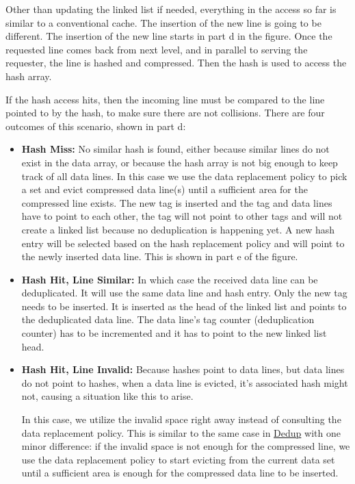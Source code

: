 Other than updating the linked list if needed, everything in the access so far is similar to a conventional cache. The insertion of the new line is going to be different. The insertion of the new line starts in part d in the figure. Once the requested line comes back from next level, and in parallel to serving the requester, the line is hashed and compressed. Then the hash is used to access the hash array.\par
If the hash access hits, then the incoming line must be compared to the line pointed to by the hash, to make sure there are not collisions. There are four outcomes of this scenario, shown in part d:
\begin{itemize}
    \item \textbf{Hash Miss:} No similar hash is found, either because similar lines do not exist in the data array, or because the hash array is not big enough to keep track of all data lines. In this case we use the data replacement policy to pick a set and evict compressed data line(s) until a sufficient area for the compressed line exists. The new tag is inserted and the tag and data lines have to point to each other, the tag will not point to other tags and will not create a linked list because no deduplication is happening yet. A new hash entry will be selected based on the hash replacement policy and will point to the newly inserted data line. This is shown in part e of the figure.
    \item \textbf{Hash Hit, Line Similar:} In which case the received data line can be deduplicated. It will use the same data line and hash entry. Only the new tag needs to be inserted. It is inserted as the head of the linked list and points to the deduplicated data line. The data line's tag counter (deduplication counter) has to be incremented and it has to point to the new linked list head.
    \item \textbf{Hash Hit, Line Invalid:} Because hashes point to data lines, but data lines do not point to hashes, when a data line is evicted, it's associated hash might not, causing a situation like this to arise.\par
        In this case, we utilize the invalid space right away instead of consulting the data replacement policy. This is similar to the same case in \hyperref[ssec:DedupOperations]{Dedup} with one minor difference: if the invalid space is not enough for the compressed line, we use the data replacement policy to start evicting from the current data set until a sufficient area is enough for the compressed data line to be inserted.\par

\end{itemize}
